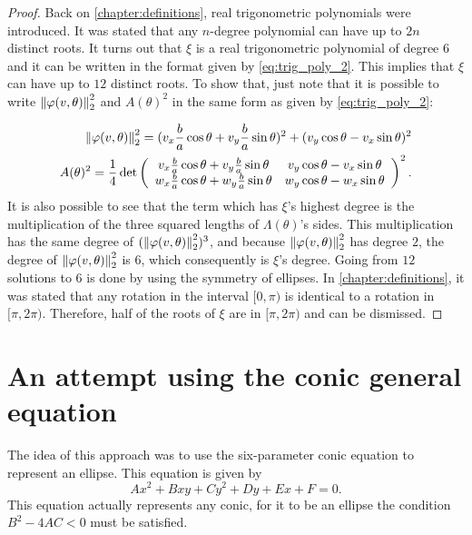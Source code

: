 \begin{proof}
	
Back on \autoref{chapter:definitions}, real trigonometric polynomials were introduced. It was stated that any $n$-degree polynomial can have up to $2n$ distinct roots. It turns out that $\xi$ is a real trigonometric polynomial of degree $6$ and it can be written in the format given by \autoref{eq:trig_poly_2}. This implies that $\xi$ can have up to $12$ distinct roots.
 To show that, just note that it is possible to write $\left\lVert\varphi(v, \theta)\right\rVert_{2}^2$ and $A(\theta)^2$ in the same form as given by \autoref{eq:trig_poly_2}:
 
 \begin{align}\label{eq:dd}
 	\left\lVert\varphi(v, \theta)\right\rVert_{2}^2 = (v_x\frac{b}{a}\cos\theta + v_y\frac{b}{a}\sin\theta)^2 + (v_y\cos\theta - v_x\sin\theta)^2\\
 	\label{eq:dd2} A(\theta)^2=\dfrac{1}{4}\det\left(
 	\begin{array}{cc}
 		v_x\frac{b}{a}\cos\theta + v_y\frac{b}{a}\sin\theta&v_y\cos\theta - v_x\sin\theta\\
 		w_x\frac{b}{a}\cos\theta + w_y\frac{b}{a}\sin\theta&w_y\cos\theta - w_x\sin\theta
 	\end{array}\right)^2.
 \end{align}
  It is also possible to see that the term which has $\xi$'s highest degree is the multiplication of the three squared lengths of $\Lambda(\theta)$'s sides. This multiplication has the same degree of $(\left\lVert\varphi(v, \theta)\right\rVert_{2}^2)^3$, and because $\left\lVert\varphi(v, \theta)\right\rVert_{2}^2$ has degree $2$, the degree of $\left\lVert\varphi(v, \theta)\right\rVert_{2}^2$ is $6$, which consequently is $\xi$'s degree.
Going from $12$ solutions to $6$ is done by using the symmetry of ellipses. In \autoref{chapter:definitions}, it was stated that any rotation in the interval $[0, \pi)$ is identical to a rotation in $[\pi, 2\pi)$. Therefore, half of the roots of $\xi$ are in $[\pi, 2\pi)$ and can be dismissed.
\end{proof}

\section{An attempt using the conic general equation}

The idea of this approach was to use the six-parameter conic equation to represent an ellipse. This equation is given by
\begin{equation}\label{eq:gen_ellipse}
Ax^2+Bxy+Cy^2+Dy+Ex+F=0.
\end{equation}
This equation actually represents any conic, for it to be an ellipse the condition $B^2 -4AC < 0$ must be satisfied.

